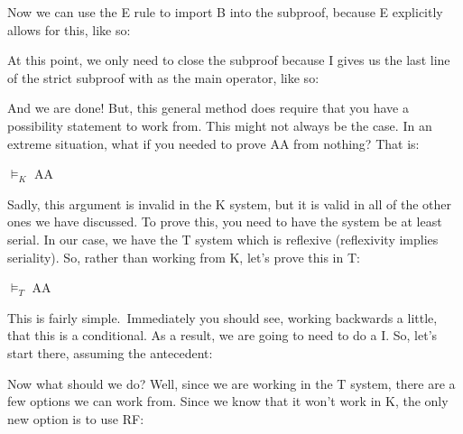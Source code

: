 Now we can use the \ebox E rule to import B into the subproof, because \ebox E explicitly allows for this, like so: 

\begin{fitchproof}
\open
{} 
\end{fitchproof}

At this point, we only need to close the subproof because \ediamond I gives us the last line of the strict subproof with \ediamond  as the main operator, like so:

\begin{fitchproof}
\open
{} 
\close
{}
\end{fitchproof}

And we are done! But, this general method does require that you have a possibility statement to work from. This might not always be the case. In an extreme situation, what if you needed to prove \ebox A\eif \ediamond A from nothing? That is:
\begin{center}
$\vDash_K$ \ebox A\eif \ediamond A
\end{center}
Sadly, this argument is invalid in the K system, but it is valid in all of the other ones we have discussed. To prove this, you need to have the system be at least serial. In our case, we have the T system which is reflexive (reflexivity implies seriality). So, rather than working from K, let's prove this in T:
\begin{center}
$\vDash_T$ \ebox A\eif \ediamond A
\end{center}
This is fairly simple. Immediately you should see, working backwards a little, that this is a conditional. As a result, we are going to need to do a \eif I. So, let's start there, assuming the antecedent:
\begin{fitchproof}
\open
{}
\end{fitchproof}

Now what should we do? Well, since we are working in the T system, there are a few options we can work from. Since we know that it won't work in K, the only new option is to use RF: 
\begin{fitchproof}
\open
{}
\end{fitchproof}

